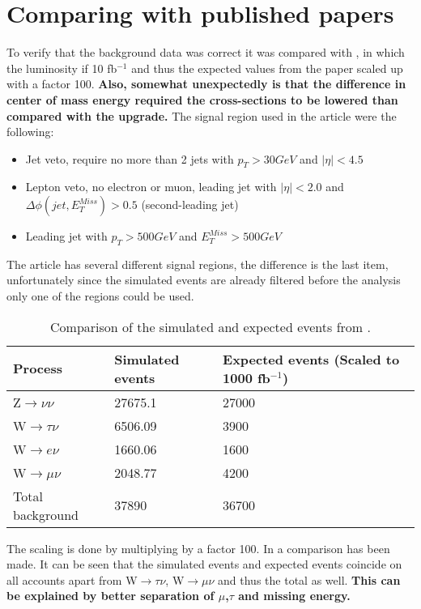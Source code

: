 \section{Comparing with published papers} 	
To verify that the background data was correct it was compared with \citep{ATLAS-CONF-2012-147}, in which the luminosity if 10 fb$^{-1}$ and thus the expected values from the paper scaled up with a factor 100. \textbf{Also, somewhat unexpectedly is that the difference in center of mass energy required the cross-sections to be lowered than compared with the upgrade.} The signal region used in the article were the following:
\begin{itemize}
\item Jet veto, require no more than 2 jets with $p_T > 30 GeV$ and $|\eta| < 4.5$
\item Lepton veto, no electron or muon, leading jet with $|\eta| < 2.0$ and $\Delta \phi (jet, E_T^{Miss})>0.5$ (second-leading jet)
\item Leading jet with $p_T > 500 GeV$ and $E_T^{Miss}>500 GeV$
\end{itemize}
The article has several different signal regions, the difference is the last item, unfortunately since the simulated events are already filtered before the analysis only one of the regions could be used.
\begin{table}[ht]
\begin{center}
\begin{tabular}{|l|l|l|}
\hline
Process & Simulated events & Expected events (Scaled to 1000 fb$^{-1}$) \\ \hline
Z$\rightarrow\nu\nu$&27675.1&27000 \\
W$\rightarrow\tau\nu$&6506.09&3900 \\
W$\rightarrow e\nu$&1660.06&1600 \\
W$\rightarrow\mu\nu$&2048.77&4200 \\ \hline
Total background&37890&36700 \\ \hline
\end{tabular}
\caption{Comparison of the simulated and expected events from \citep{ATLAS-CONF-2012-147}.}
\label{tab:Compare1}
\end{center}
\end{table}

The scaling is done by multiplying by a factor 100.
In  a comparison has been made. It can be seen that the simulated events and expected events coincide on all accounts apart from W$\rightarrow\tau\nu$, W$\rightarrow\mu\nu$ and thus the total as well. \textbf{This can be explained by better separation of $\mu$,$\tau$ and missing energy.} 


